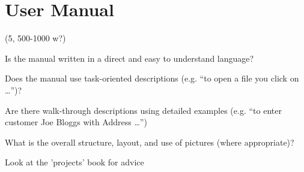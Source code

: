 \newpage
\section{User Manual}
\label{sec:user_manual}


(5, 500-1000 w?)

Is the manual written in a direct and easy to understand language?

Does the manual use task-oriented descriptions (e.g. “to open a file you click
on …”)?

Are there walk-through descriptions using detailed examples (e.g. “to enter
customer Joe Bloggs with Address …”)

What is the overall structure, layout, and use of pictures (where appropriate)?

Look at the 'projects' book for advice
